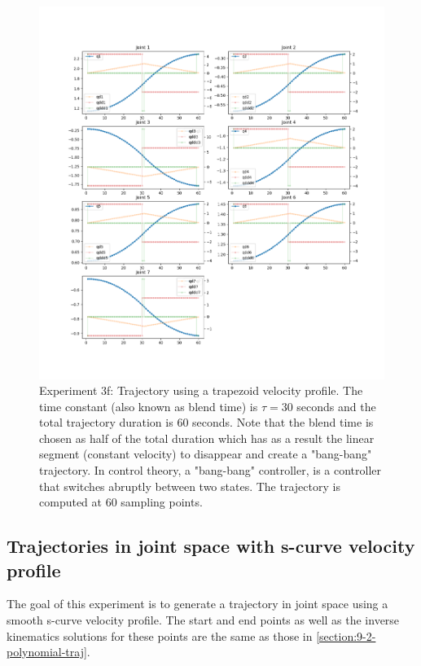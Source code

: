 \begin{center}
\begin{figure}[H]
\centering
\includegraphics[width=\textwidth]{images/robot_planner3/3f_trapezoid2.png}
\caption{Experiment 3f: Trajectory using a trapezoid velocity profile. The time constant (also known as blend time) is $τ = 30$ seconds and the total trajectory duration is 60 seconds. Note that 
the blend time is chosen as half of the total duration which has as a result the linear segment (constant velocity) to disappear and create a "bang-bang" trajectory. In control theory, a "bang-bang" controller, 
is a controller that switches abruptly between two states. The trajectory is computed at 60 sampling points.}
\label{robot-planner3f-joint-trapezoid2}
\end{figure}
\end{center}


\subsection{Trajectories in joint space with s-curve velocity profile}

The goal of this experiment is to generate a trajectory in joint space using a smooth s-curve velocity profile. The start and end points as well as the inverse kinematics solutions for these points are the same as those 
in \ref{section:9-2-polynomial-traj}.

